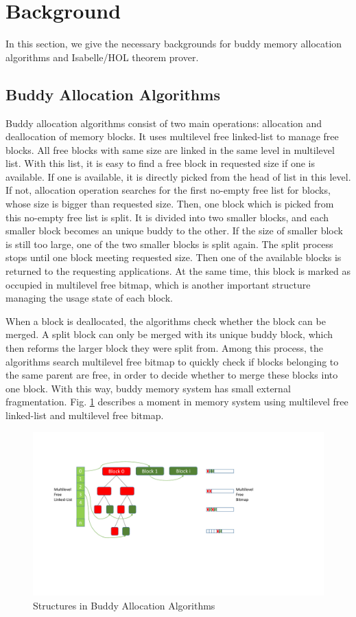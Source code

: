 \section{Background}
In this section, we give the necessary backgrounds for buddy memory allocation algorithms and Isabelle/HOL theorem prover.

\subsection{Buddy Allocation Algorithms}
Buddy allocation algorithms consist of two main operations: allocation and deallocation of memory blocks. It uses multilevel free linked-list to manage free blocks. All free blocks with same size are linked in the same level in multilevel list. With this list, it is easy to find a free block in requested size if one is available. If one is available, it is directly picked from the head of list in this level. If not, allocation operation searches for the first no-empty free list for blocks, whose size is bigger than requested size. Then, one block which is picked from this no-empty free list is split. It is divided into two smaller blocks, and each smaller block becomes an unique buddy to the other. If the size of smaller block is still too large, one of the two smaller blocks is split again. The split process stops until one block meeting requested size. Then one of the available blocks is returned to the requesting applications. At the same time, this block is marked as occupied in multilevel free bitmap, which is another important structure managing the usage state of each block.

When a block is deallocated, the algorithms check whether the block can be merged. A split block can only be merged with its unique buddy block, which then reforms the larger block they were split from. Among this process, the algorithms search multilevel free bitmap to quickly check if blocks belonging to the same parent are free, in order to decide whether to merge these blocks into one block. With this way, buddy memory system has small external fragmentation. Fig. \ref{fig3} describes a moment in memory system using multilevel free linked-list and multilevel free bitmap.

\begin{figure}[htbp]
	\centering
	\includegraphics[width=1\textwidth]{fig3.pdf}
	\caption{Structures in Buddy Allocation Algorithms}
	\label{fig3}
\end{figure}

